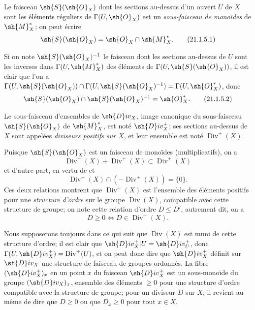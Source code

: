 \begin{env}[21.1.5]
\label{IV.21.1.5}
Le faisceau $\sh{S}(\sh{O}_X)$  dont les sections au-dessus d'un ouvert $U$ de $X$ sont les éléments réguliers de $\Gamma(U,\sh{O}_X)$ est un \emph{sous-faisceau de monoïdes} de $\sh{M}_X^*$; on peut écrire
\[
\label{IV.21.1.5.1}
  \sh{S}(\sh{O}_X)=\sh{O}_X\cap\sh{M}_X^*.
  \tag{21.1.5.1}
\]
\end{env}


Si on note $\sh{S}(\sh{O}_X)^{-1}$ le faisceau dont les sections au-dessus de $U$ sont les inverses dans $\Gamma(U,\sh{M}_X^*)$ des éléments de $\Gamma(U,\sh{S}(\sh{O}_X))$, il est clair que l'on a $\Gamma(U,\sh{S}(\sh{O}_X))\cap\Gamma(U,\sh{S}(\sh{O}_X)^{-1})=\Gamma(U,\sh{O}_X^*)$, donc
\[
\label{IV.21.1.5.2}
  \sh{S}(\sh{O}_X)\cap\sh{S}(\sh{O}_X)^{-1}=\sh{O}_X^*.
  \tag{21.1.5.2}
\]

\begin{definition}[21.1.6]
Le sous-faisceau d'ensembles de $\sh{D}iv_X$, image canonique du sous-faisceau $\sh{S}(\sh{O}_X)$ de $\sh{M}_X^*$, est noté $\sh{D}iv_X^+$; ses sections au-dessus de $X$ sont appelées \emph{diviseurs positifs sur $X$}, et leur ensemble est noté $\operatorname{Div}^+(X)$.
\end{definition}

Puisque $\sh{S}(\sh{O}_X)$ est un faisceau de monoïdes (multiplicatifs), on a
\[
\label{IV.21.1.6.1}
  \operatorname{Div}^+(X)+\operatorname{Div}^+(X)\subset\operatorname{Div}^+(X)
  \tag{21.1.6.1}
\]
et d'autre part, en vertu de  et 
\[
\label{IV.21.1.6.2}
  \operatorname{Div}^+(X)\cap(-\operatorname{Div}^+(X))=\{0\}.
  \tag{21.1.6.2}
\]
Ces deux relations montrent que $\operatorname{Div}^+(X)$ est l'ensemble des éléments positifs pour une \emph{structure d'ordre} sur le groupe $\operatorname{Div}(X)$, compatible avec cette structure de groupe; on note cette relation d'ordre $D\leq D'$, autrement dit, on a
\[
\label{IV.21.1.6.3}
  D\geq0 \iff D\in\operatorname{Div}^+(X).
  \tag{21.1.6.3}
\]

Nous supposerons toujours dans ce qui suit que $\operatorname{Div}(X)$ est muni de cette structure d'ordre;
il est clair que $\sh{D}iv_X^+|U=\sh{D}iv_U^+$, donc $\Gamma(U,\sh{D}iv_X^+)=\operatorname{Div}^+(U)$, et on peut donc dire que $\sh{D}iv_X^+$ définit sur $\sh{D}iv_X$ une structure de faisceau de groupes ordonnés.
La fibre $(\sh{D}iv_X^+)_x$ en un point $x$ du faisceau $\sh{D}iv_X^+$ est un sous-monoïde du groupe $(\sh{D}iv_X)_x$, ensemble des éléments $\geq0$ pour une structure d'ordre compatible avec la structure de groupe;
pour un diviseur $D$ sur $X$, il revient au même de dire que $D\geq0$ ou que $D_x\geq0$ pour tout $x\in X$.

